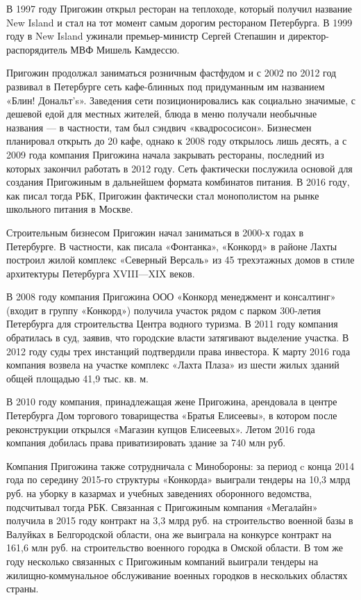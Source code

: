 В 1997 году Пригожин открыл ресторан на теплоходе, который получил название New Island и стал на тот момент самым дорогим рестораном Петербурга.
В 1999 году в New Island ужинали премьер-министр Сергей Степашин и директор-распорядитель МВФ Мишель Камдессю.

Пригожин продолжал заниматься розничным фастфудом и с 2002 по 2012 год развивал в Петербурге сеть кафе-блинных под придуманным им названием «Блин! Дональт's». Заведения сети позиционировались как социально значимые, с дешевой едой для местных жителей, блюда в меню получали необычные названия — в частности, там был сэндвич «квадрососисон». Бизнесмен планировал открыть до 20 кафе, однако к 2008 году открылось лишь десять, а с 2009 года компания Пригожина начала закрывать рестораны, последний из которых закончил работать в 2012 году. Сеть фактически послужила основой для создания Пригожиным в дальнейшем формата комбинатов питания. В 2016 году, как писал тогда РБК, Пригожин фактически стал монополистом на рынке школьного питания в Москве.

Строительным бизнесом Пригожин начал заниматься в 2000-х годах в Петербурге. В частности, как писала «Фонтанка», «Конкорд» в районе Лахты построил жилой комплекс «Северный Версаль» из 45 трехэтажных домов в стиле архитектуры Петербурга XVIII—XIX веков.

В 2008 году компания Пригожина ООО «Конкорд менеджмент и консалтинг» (входит в группу «Конкорд») получила участок рядом с парком 300-летия Петербурга для строительства Центра водного туризма. В 2011 году компания обратилась в суд, заявив, что городские власти затягивают выделение участка. В 2012 году суды трех инстанций подтвердили права инвестора. К марту 2016 года компания возвела на участке комплекс «Лахта Плаза» из шести жилых зданий общей площадью 41,9 тыс. кв. м.

В 2010 году компания, принадлежащая жене Пригожина, арендовала в центре Петербурга Дом торгового товарищества «Братья Елисеевы», в котором после реконструкции открылся «Магазин купцов Елисеевых». Летом 2016 года компания добилась права приватизировать здание за 740 млн руб.

Компания Пригожина также сотрудничала с Минобороны: за период c конца 2014 года по середину 2015-го структуры «Конкорда» выиграли тендеры на 10,3 млрд руб. на уборку в казармах и учебных заведениях оборонного ведомства, подсчитывал тогда РБК. Связанная с Пригожиным компания «Мегалайн» получила в 2015 году контракт на 3,3 млрд руб. на строительство военной базы в Валуйках в Белгородской области, она же выиграла на конкурсе контракт на 161,6 млн руб. на строительство военного городка в Омской области. В том же году несколько связанных с Пригожиным компаний выиграли тендеры на жилищно-коммунальное обслуживание военных городков в нескольких областях страны.

